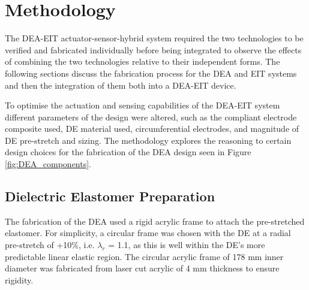 





\section{Methodology} %
\label{sec:method}
The DEA-EIT actuator-sensor-hybrid system required the two technologies to be verified and fabricated individually before being integrated to observe the effects of combining the two technologies relative to their independent forms. The following sections discuss the fabrication process for the DEA and EIT systems and then the integration of them both into a DEA-EIT device.

To optimise the actuation and sensing capabilities of the DEA-EIT system different parameters of the design were altered, such as the compliant electrode composite used, DE material used, circumferential electrodes, and magnitude of DE pre-stretch and sizing. The methodology explores the reasoning to certain design choices for the fabrication of the DEA design seen in Figure \ref{fig:DEA_components}.


\subsection{Dielectric Elastomer Preparation}
\label{subsec:de_fab}
The fabrication of the DEA used a rigid acrylic frame to attach the pre-stretched elastomer. For simplicity, a circular frame was chosen with the DE at a radial pre-stretch of +10\%, i.e. $\lambda_r$ = 1.1, as this is well within the DE's more predictable linear elastic region. The circular acrylic frame of 178 mm inner diameter was fabricated from laser cut acrylic of 4 mm thickness to ensure rigidity.

